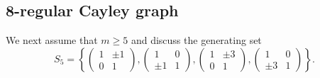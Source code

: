 \newpage

\subsection{8-regular Cayley graph}

We next assume that $m \geq 5$ and discuss the generating set $$S_5 =  \left\{ \begin{pmatrix}
1 & \pm 1 \\ 0 & 1 
\end{pmatrix}, \begin{pmatrix}
1 & 0 \\ \pm 1 & 1 
\end{pmatrix} , \begin{pmatrix}
1 & \pm 3 \\ 0 & 1 
\end{pmatrix}, \begin{pmatrix}
1 & 0 \\ \pm 3 & 1 
\end{pmatrix} \right\}.$$

\vspace{2em}

